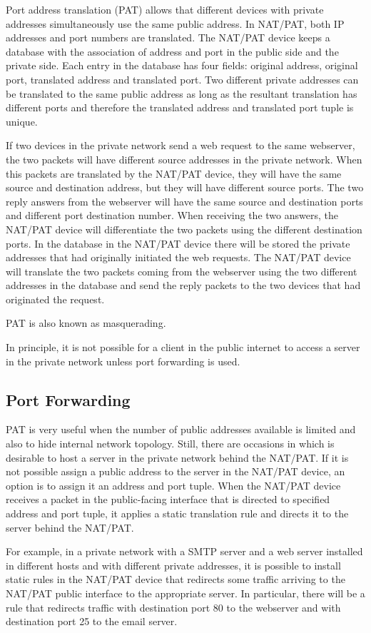Port address translation (PAT) allows that different devices with private addresses simultaneously use the same public address.
In NAT/PAT, both IP addresses and port numbers are translated.
The NAT/PAT device keeps a database with the association of address and port in the public side and the private side.
Each entry in the database has four fields: original address, original port, translated address and translated port.
Two different private addresses can be translated to the same public address as long as the resultant translation has different ports and therefore the translated address and translated port tuple is unique.

If two devices in the private network send a web request to the same webserver, the two packets will have different source addresses in the private network.
When this packets are translated by the NAT/PAT device, they will have the same source and destination address, but they will have different source ports.
The two reply answers from the webserver will have the same source and destination ports and different port destination number.
When receiving the two answers, the NAT/PAT device will differentiate the two packets using the different destination ports.
In the database in the NAT/PAT device there will be stored the private addresses that had originally initiated the web requests.
The NAT/PAT device will translate the two packets coming from the webserver using the two different addresses in the database and send the reply packets to the two devices that had originated the request.

PAT is also known as masquerading.

In principle, it is not possible for a client in the public internet to access a server in the private network unless port forwarding is used.

\subsection{Port Forwarding}

PAT is very useful when the number of public addresses available is limited and also to hide internal network topology.
Still, there are occasions in which is desirable to host a server in the private network behind the NAT/PAT.
If it is not possible assign a public address to the server in the NAT/PAT device, an option is to assign it an address and port tuple.
When the NAT/PAT device receives a packet in the public-facing interface that is directed to specified address and port tuple, it applies a static translation rule and directs it to the server behind the NAT/PAT.

For example, in a private network with a SMTP server and a web server installed in different hosts and with different private addresses, it is possible to install static rules in the NAT/PAT device that redirects some traffic arriving to the NAT/PAT public interface to the appropriate server.
In particular, there will be a rule that redirects traffic with destination port 80 to the webserver and with destination port 25 to the email server.
